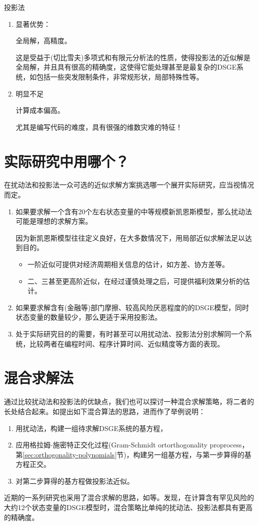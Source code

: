 投影法
\begin{enumerate}
  \item 显著优势：

  全局解，高精度。

  这是受益于(切比雪夫)多项式和有限元分析法的性质，使得投影法的近似解是全局解，并且具有很高的精确度\citep{Aruoba:2006cz, Caldara:2012fr}，这使得它能处理甚至是最复杂的DSGE系统，如包括一些突发限制条件，非常规形状，局部特殊性等。

  \item 明显不足

  计算成本偏高。

  尤其是编写代码的难度，具有很强的维数灾难的特征！
\end{enumerate}

\section{实际研究中用哪个？}
\label{sec:pt-pj-comp-choose}
在扰动法和投影法一众可选的近似求解方案挑选哪一个展开实际研究，应当视情况而定。

\begin{enumerate}
  \item 如果要求解一个含有20个左右状态变量的中等规模新凯恩斯模型，那么扰动法可能是理想的求解方案。

因为新凯恩斯模型往往定义良好，在大多数情况下，用局部近似求解法足以达到目的。
\begin{itemize}
  \item 一阶近似可提供对经济周期相关信息的估计，如方差、协方差等。
  \item 二、三甚至更高阶近似，在经过谨慎处理之后，可提供福利效果分析的估计\citep{Levintal:2017dm}。
\end{itemize}

\item 如果要求解含有(金融等)部门摩擦、较高风险厌恶程度的的DSGE模型，同时状态变量的数量较少，那么更适于采用投影法。

\item 处于实际研究目的的需要，有时甚至可以用扰动法、投影法分别求解同一个系统，比较两者在编程时间、程序计算时间、近似精度等方面的表现。
\end{enumerate}

\section{混合求解法}
\label{sec:pt-pj-comp-hybrid}

通过比较扰动法和投影法的优缺点，我们也可以探讨一种混合求解策略，将二者的长处结合起来。如\cite[Sec 5.6]{Judd:1998uy}提出如下混合算法的思路，进而作了举例说明：
\begin{enumerate}
  \item 用扰动法，构建一组待求解DSGE系统的基方程，
  \item 应用格拉姆-施密特正交化过程(Gram-Schmidt ortorthogonality proprocess， 第\ref{sec:orthogonality-polynomials}节)，构建另一组基方程，与第一步算得的基方程正交。
  \item 对第二步算得的基方程做投影法近似。
\end{enumerate}

近期的一系列研究也采用了混合求解的思路，如\cite{Maliar:2012gv, FernandezVillaverde:2016wg, Levintal:2017bp}等。\cite{FernandezVillaverde:2016wg}发现，在计算含有罕见风险的大约12个状态变量的DSGE模型时，混合策略比单纯的扰动法、投影法都具有更高的精确度。
